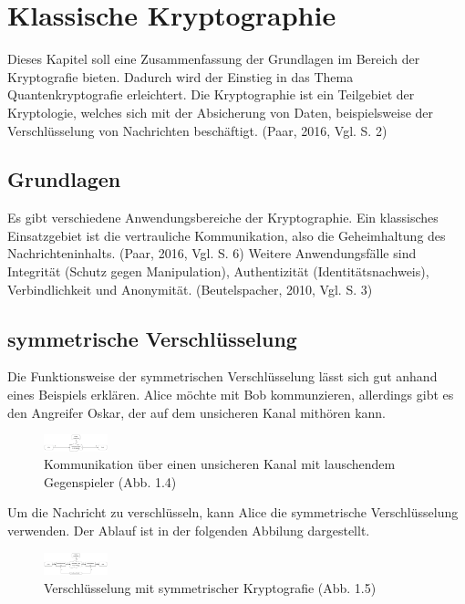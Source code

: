 \section{Klassische Kryptographie}
Dieses Kapitel soll eine Zusammenfassung der Grundlagen im Bereich der Kryptografie bieten. Dadurch wird der Einstieg in das Thema Quantenkryptografie erleichtert.
Die Kryptographie ist ein Teilgebiet der Kryptologie, welches sich mit der Absicherung von Daten, beispielsweise der Verschlüsselung von Nachrichten beschäftigt. (Paar, 2016, Vgl. S. 2) 
\subsection{Grundlagen}

Es gibt verschiedene Anwendungsbereiche der Kryptographie. Ein klassisches Einsatzgebiet ist die vertrauliche Kommunikation, also die Geheimhaltung des Nachrichteninhalts. (Paar, 2016, Vgl. S. 6) 
Weitere Anwendungsfälle sind Integrität (Schutz gegen Manipulation), Authentizität (Identitätsnachweis), Verbindlichkeit und Anonymität. (Beutelspacher, 2010, Vgl. S. 3)
\subsection{symmetrische Verschlüsselung}


Die Funktionsweise der symmetrischen Verschlüsselung lässt sich gut anhand eines Beispiels erklären. Alice möchte mit Bob kommunzieren, allerdings gibt es den Angreifer Oskar, der auf dem unsicheren Kanal mithören kann. 


\begin{figure}
    \includegraphics[width=70]{content/bob-alice_unsicherer-kanal.png}
    \caption{Kommunikation über einen unsicheren Kanal mit lauschendem Gegenspieler (Abb. 1.4)}
\end{figure} 

Um die Nachricht zu verschlüsseln, kann Alice die symmetrische Verschlüsselung verwenden. Der Ablauf ist in der folgenden Abbilung dargestellt.
\begin{figure}
    \includegraphics[width=70]{content/bob-alice_sicherer-kanal.png}
    \caption{Verschlüsselung mit symmetrischer Kryptografie (Abb. 1.5)}
\end{figure} 

